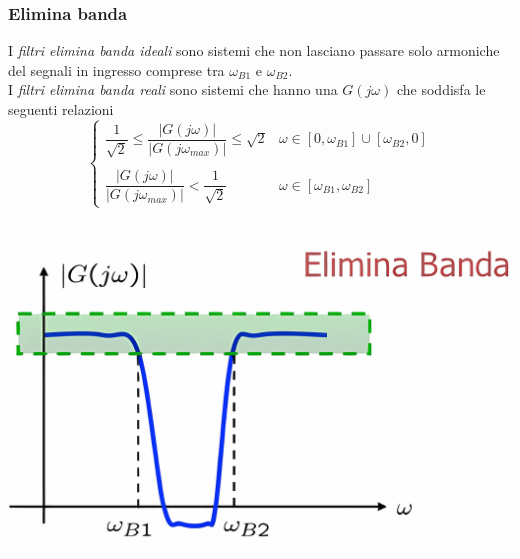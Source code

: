 \documentclass{article}
\numberwithin{equation}{subsection}
\begin{document}
\subsubsection{Elimina banda}
I \textit{filtri elimina banda ideali} sono sistemi che non lasciano passare solo armoniche del segnali in ingresso comprese tra $\omega_{B1}$ e $\omega_{B2}$.\\
I \textit{filtri elimina banda reali} sono sistemi che hanno una $G(j\omega)$ che soddisfa le seguenti relazioni
\begin{equation}
    \begin{cases}
        \dfrac{1}{\sqrt{2}} \leq \dfrac{|G(j\omega)|}{|G(j\omega_{max})|} \leq \sqrt{2}  & \omega \in [0, \omega_{B1}] \cup [\omega_{B2}, 0]\\
        \\
        \dfrac{|G(j\omega)|}{|G(j\omega_{max})|} < \dfrac{1}{\sqrt{2}}  &\omega \in [\omega_{B1}, \omega_{B2}]
    \end{cases}
\end{equation}
\begin{center}
    \includegraphics[scale=0.15]{Images/Elimina_banda.png}
\end{center}
\end{document}

